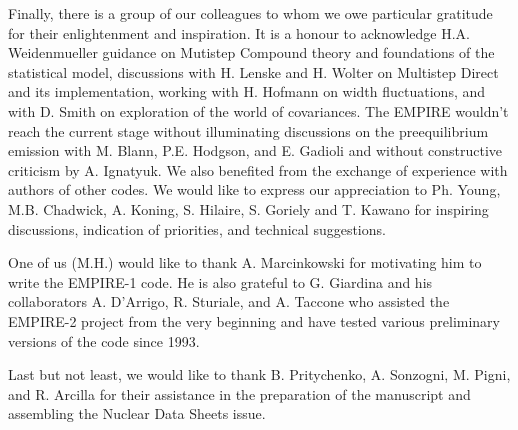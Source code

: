 Finally, there is a group of our colleagues to whom we owe particular
gratitude for their enlightenment and inspiration. It is a honour to
acknowledge H.A. Weidenmueller guidance on Mutistep Compound theory and
foundations of the statistical model, discussions with H. Lenske and H.
Wolter on Multistep Direct and its implementation, working with H. Hofmann
on width fluctuations, and with D. Smith on exploration of the world of
covariances. The EMPIRE wouldn't reach the current stage without
illuminating discussions on the preequilibrium emission with M. Blann, P.E.
Hodgson, and E. Gadioli and without constructive criticism by A. Ignatyuk.
We also benefited from the exchange of experience with authors of other
codes. We would like to express our appreciation to Ph. Young, M.B.
Chadwick, A. Koning, S. Hilaire, S. Goriely and T. Kawano for inspiring
discussions, indication of priorities, and technical suggestions.

One of us (M.H.) would like to thank A. Marcinkowski for motivating him to
write the EMPIRE-1 code. He is also grateful to G. Giardina and his
collaborators A. D'Arrigo, R. Sturiale, and A. Taccone who assisted the
EMPIRE-2 project from the very beginning and have tested various preliminary
versions of the code since 1993.

Last but not least, we would like to thank B. Pritychenko, A. Sonzogni, M.
Pigni, and R. Arcilla for their assistance in the preparation of the
manuscript and assembling the Nuclear Data Sheets issue.





